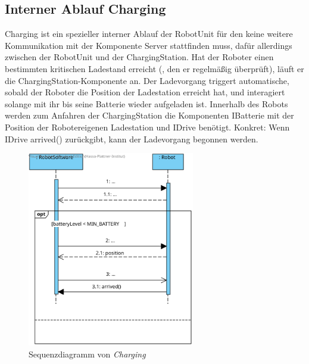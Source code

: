 	\subsection*{Interner Ablauf Charging}
	Charging ist ein spezieller interner Ablauf der RobotUnit für den keine weitere Kommunikation mit der Komponente Server stattfinden muss, dafür allerdings zwischen der RobotUnit und der ChargingStation. Hat der Roboter einen bestimmten kritischen Ladestand erreicht (, den er regelmäßig überprüft), läuft er die ChargingStation-Komponente an. Der Ladevorgang triggert automatische, sobald der Roboter die Position der Ladestation erreicht hat, und interagiert solange mit ihr bis seine Batterie wieder aufgeladen ist. Innerhalb des Robots werden zum Anfahren der ChargingStation die Komponenten IBatterie mit der Position der Robotereigenen Ladestation und IDrive benötigt. Konkret: Wenn IDrive arrived() zurückgibt, kann der Ladevorgang begonnen werden.
	\vspace{1cm}
	
	\begin{figure}[H]
		\centering
		\includegraphics[width=0.65\textwidth]{img/0-Entwurf-8-Charging}
		\caption{Sequenzdiagramm von \textit{Charging}}
		\label{Charging}
	\end{figure}
